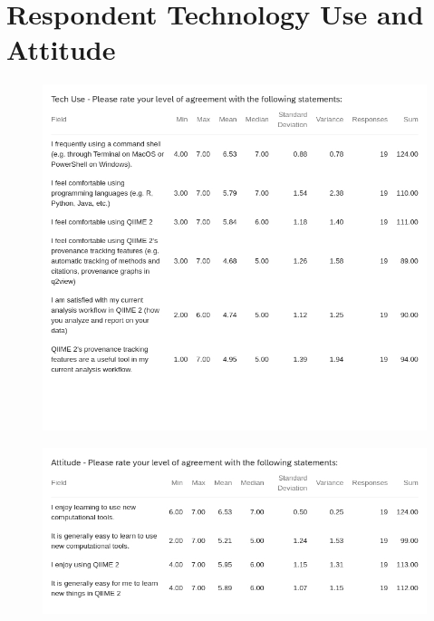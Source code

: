 \chapter{Respondent Technology Use and Attitude}
\label{app:techUse}

\begin{figure}[htp]
\centering
\includegraphics[width=\textwidth]{figures/tech_use.jpg}
\end{figure}

\begin{figure}[htp]
\centering
\includegraphics[width=\textwidth]{figures/attitude.jpg}
\end{figure}